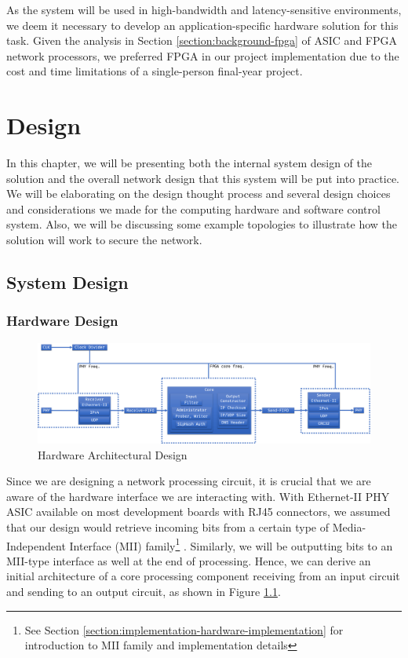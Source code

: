 \documentclass[a4paper]{report}
\begin{document}
As the system will be used in high-bandwidth and latency-sensitive environments, we deem it necessary to develop an application-specific hardware solution for this task. Given the analysis in Section \ref{section:background-fpga} of ASIC and FPGA network processors, we preferred FPGA in our project implementation due to the cost and time limitations of a single-person final-year project.


\chapter{Design}

In this chapter, we will be presenting both the internal system design of the solution and the overall network design that this system will be put into practice. We will be elaborating on the design thought process and several design choices and considerations we made for the computing hardware and software control system. Also, we will be discussing some example topologies to illustrate how the solution will work to secure the network.

\section{System Design}

\subsection{Hardware Design}
\label{section:design-system-design-hardware}

\begin{figure}[h!]
  \includegraphics[width=\textwidth]{imgs/hardware-design.png}
  \caption{Hardware Architectural Design}
  \label{fig:hardware-design}
\end{figure}

Since we are designing a network processing circuit, it is crucial that we are aware of the hardware interface we are interacting with. With Ethernet-II PHY ASIC available on most development boards with RJ45 connectors, we assumed that our design would retrieve incoming bits from a certain type of Media-Independent Interface (MII) family\footnote{See Section \ref{section:implementation-hardware-implementation} for introduction to MII family and implementation details} \cite{}. Similarly, we will be outputting bits to an MII-type interface as well at the end of processing. Hence, we can derive an initial architecture of a core processing component receiving from an input circuit and sending to an output circuit, as shown in Figure \ref{fig:hardware-design}.
\end{document}
